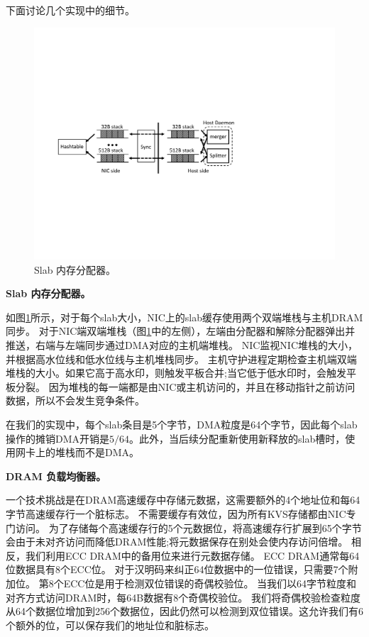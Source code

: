 下面讨论几个实现中的细节。


\begin{figure}[t]
\centering
\includegraphics[width=.8\textwidth,page=1]{figure/cropped_slab.pdf}
\caption{Slab 内存分配器。}
\label{kvdirect:fig:slab}

\end{figure}

\textbf {Slab 内存分配器。}

如图\ref {kvdirect:fig:slab}所示，对于每个slab大小，NIC上的slab缓存使用两个双端堆栈与主机DRAM同步。
对于NIC端双端堆栈（图\ref {kvdirect:fig:slab}中的左侧），左端由分配器和解除分配器弹出并推送，右端与左端同步通过DMA对应的​​主机端堆栈。
NIC监视NIC堆栈的大小，并根据高水位线和低水位线与主机堆栈同步。
主机守护进程定期检查主机端双端堆栈的大小。如果它高于高水印，则触发平板合并;当它低于低水印时，会触发平板分裂。
因为堆栈的每一端都是由NIC或主机访问的，并且在移动指针之前访问数据，所以不会发生竞争条件。

在我们的实现中，每个slab条目是5个字节，DMA粒度是64个字节，因此每个slab操作的摊销DMA开销是$ 5/64 $。此外，当后续分配重新使用新释放的slab槽时，使用网卡上的堆栈而不是DMA。


\textbf{DRAM 负载均衡器。}

一个技术挑战是在DRAM高速缓存中存储元数据，这需要额外的4个地址位和每64字节高速缓存行一个脏标志。
不需要缓存有效位，因为所有KVS存储都由NIC专门访问。
为了存储每个高速缓存行的5个元数据位，将高速缓存行扩展到65个字节会由于未对齐访问而降低DRAM性能;将元数据保存在别处会使内存访问倍增。
相反，我们利用ECC DRAM中的备用位来进行元数据存储。
ECC DRAM通常每64位数据具有8个ECC位。
对于汉明码来纠正64位数据中的一位错误，只需要7个附加位。
第8个ECC位是用于检测双位错误的奇偶校验位。
当我们以64字节粒度和对齐方式访问DRAM时，每64B数据有8个奇偶校验位。
我们将奇偶校验检查粒度从64个数据位增加到256个数据位，因此仍然可以检测到双位错误。这允许我们有6个额外的位，可以保存我们的地址位和脏标志。

